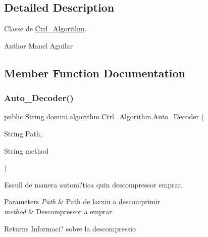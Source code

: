 \subsection{Detailed Description}
Classe de \hyperlink{classdomini_1_1algorithm_1_1Ctrl__Algorithm}{Ctrl\+\_\+\+Algorithm}. 

\begin{DoxyAuthor}{Author}
Manel Aguilar 
\end{DoxyAuthor}


\subsection{Member Function Documentation}
\mbox{\label{classdomini_1_1algorithm_1_1Ctrl__Algorithm_a613d15cc5326fc688b11d2c71ec9500a}} 
\subsubsection{\texorpdfstring{Auto\+\_\+\+Decoder()}{Auto\_Decoder()}}
{\footnotesize\ttfamily public String domini.\+algorithm.\+Ctrl\+\_\+\+Algorithm.\+Auto\+\_\+\+Decoder (\begin{DoxyParamCaption}\item[{String}]{Path,  }\item[{String}]{method }\end{DoxyParamCaption})\hspace{0.3cm}{\ttfamily [inline]}}



Escull de manera autom?tica quin descompressor emprar. 


\begin{DoxyParams}{Parameters}
{\em Path} & Path de l\textquotesingle{}arxiu a descomprimir \\
\hline
{\em method} & Descompressor a emprar \\
\hline
\end{DoxyParams}
\begin{DoxyReturn}{Returns}
Informaci? sobre la descompressio 
\end{DoxyReturn}
\mbox{\label{classdomini_1_1algorithm_1_1Ctrl__Algorithm_a6f7a706e07d4e6f8c1ea293d06e17318}} 
